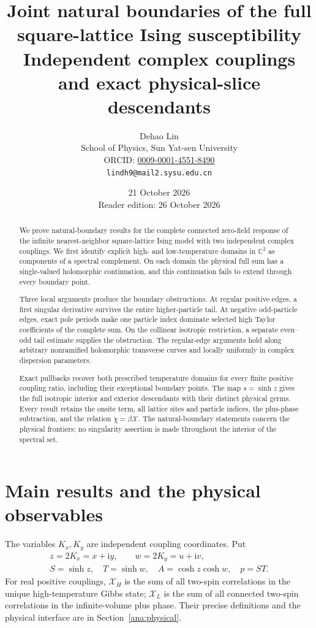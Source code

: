\documentclass[11pt]{article}
\title{Joint natural boundaries of the full square-lattice\newline
Ising susceptibility\newline
\large Independent complex couplings and exact physical-slice descendants}
\author{Dehao Lin\\School of Physics, Sun Yat-sen University\\\small ORCID: \href{https://orcid.org/0009-0001-4551-8490}{0009-0001-4551-8490}\\\small\texttt{lindh9@mail2.sysu.edu.cn}}
\date{21 October 2026\\\small Reader edition: 26 October 2026}
\numberwithin{equation}{section}
\theoremstyle{definition}
\newcommand{\C}{\mathbb C}
\newcommand{\ii}{\mathrm i}
\begin{document}
\maketitle
\begin{abstract}
We prove natural-boundary results for the complete connected zero-field
response of the infinite nearest-neighbor square-lattice Ising model
with two independent complex couplings. We first identify explicit
high- and low-temperature domains in \(\C^2\) as components of a
spectral complement. On each domain the physical full sum has a
single-valued holomorphic continuation, and this continuation fails to
extend through every boundary point.

Three local arguments produce the boundary obstructions. At regular
positive edges, a first singular derivative survives the entire
higher-particle tail. At negative odd-particle edges, exact pole periods
make one particle index dominate selected high Taylor coefficients of
the complete sum. On the collinear isotropic restriction, a separate
even--odd tail estimate supplies the obstruction. The regular-edge
arguments hold along arbitrary nonramified holomorphic transverse
curves and locally uniformly in complex dispersion parameters.

Exact pullbacks recover both prescribed temperature domains for every
finite positive coupling ratio, including their exceptional boundary
points. The map \(s=\sinh z\) gives the full isotropic interior and
exterior descendants with their distinct physical germs. Every result
retains the onsite term, all lattice sites and particle indices, the
plus-phase subtraction, and the relation \(\chi=\beta\mathcal X\).
The natural-boundary statements concern the physical frontiers; no
singularity assertion is made throughout the interior of the spectral set.
\end{abstract}

\section{Main results and the physical observables}
\label{main:statement}

The variables \(K_x,K_y\) are independent coupling coordinates.
Put
\[
 \begin{gathered}
 z=2K_x=x+\ii y,\qquad w=2K_y=u+\ii v,\\
 S=\sinh z,\quad T=\sinh w,\quad A=\cosh z\cosh w,\quad p=ST.
 \end{gathered}
\]
For real positive couplings, \(\mathcal X_H\) is the sum of all
two-spin correlations in the unique high-temperature Gibbs state;
\(\mathcal X_L\) is the sum of all connected two-spin correlations
in the infinite-volume plus phase. Their precise definitions and the
physical interface are in Section~\ref{ana:physical}.
\end{document}
